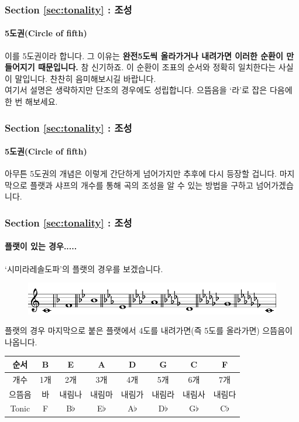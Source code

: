 \documentclass{beamer}
\begin{document}
	\begin{frame}
		\frametitle{Section \ref{sec:tonality} : 조성}
		\framesubtitle{5도권(Circle of fifth)}
		이를 5도권이라 합니다. 그 이유는 {\bf 완전5도씩 올라가거나 내려가면 이러한 순환이 만들어지기 때문입니다.} 참 신기하죠. 이 순환이 조표의 순서와 정확히 일치한다는 사실이 말입니다. 찬찬히 음미해보시길 바랍니다.\\
		여기서 설명은 생략하지만 단조의 경우에도 성립합니다. 으뜸음을 `라'로 잡은 다음에 한 번 해보세요.
	\end{frame}
	
	\begin{frame}
		\frametitle{Section \ref{sec:tonality} : 조성}
		\framesubtitle{5도권(Circle of fifth)}
		아무튼 5도권의 개념은 이렇게 간단하게 넘어가지만 추후에 다시 등장할 겁니다. 마지막으로 플랫과 샤프의 개수를 통해 곡의 조성을 알 수 있는 방법을 구하고 넘어가겠습니다.
	\end{frame}
	
	\begin{frame}
		\frametitle{Section \ref{sec:tonality} : 조성}
		\framesubtitle{플랫이 있는 경우.....}
		`시미라레솔도파'의 플랫의 경우를 보겠습니다.
		\begin{figure}
			\centering
			\includegraphics[width=\textwidth]{res/pdf/8/tone/flat.pdf}
		\end{figure}
		플랫의 경우 마지막으로 붙은 플랫에서 4도를 내려가면(즉 5도를 올라가면) 으뜸음이 나옵니다.
		\vskip -1.5pc
		\begin{table}
			\small
			\begin{tabular}{|c|c|c|c|c|c|c|c|}
				\hline
				순서 & B & E & A & D & G & C & F \\ \hline
				개수 & 1개 & 2개 & 3개 & 4개 & 5개 & 6개 & 7개 \\ \hline
				으뜸음 & 바 & 내림나 & 내림마 & 내림가 & 내림라 & 내림사 & 내림다 \\ \hline
				Tonic & F & B$\flat$ & E$\flat$ & A$\flat$ & D$\flat$ & G$\flat$ & C$\flat$ \\ \hline
			\end{tabular}
		\end{table}
	\end{frame}
	
\end{document}
